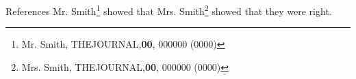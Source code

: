 \documentclass{beamer}
\begin{document}
\begin{frame}{References}
    Mr. Smith\footnote{\tiny Mr. Smith, THEJOURNAL,{\bf 00}, 000000 (0000)} showed that Mrs. Smith\footnote{\tiny Mrs. Smith, THEJOURNAL,{\bf 00}, 000000 (0000)} showed that they were right.
\end{frame}
\end{document}
